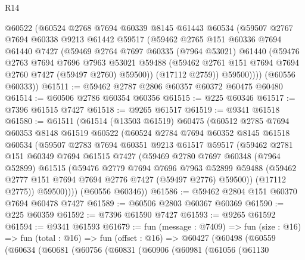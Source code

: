 \begin{lexlean}{R14}
\begin{coremodule}
        @60522
        (@60524
          @2768
          @7694
          @60339
          @8145
          @61443
          @60534
          (@59507
            @2767
            @7694
            @60338
            @9213
            @61442
            @59517
            (@59462
              @2765
              @151
              @60336
              @7694
              @61440
              @7427
              (@59469
                @2764
                @7697
                @60335
                (@7964 @53021)
                @61440
                (@59476
                  @2763
                  @7694
                  @7696
                  @7963
                  @53021
                  @59488
                  (@59462 @2761 @151 @7694 @7694 @2760 @7427 (@59497 @2760) @59500))
                (@17112 @2759))
              @59500))))
      (@60556 @60333))
@61511 := @59462 @2787 @2806 @60357 @60372 @60475 @60480
@61514 := @60506 @2786 @60354 @60356
@61515 := @225 @60346
@61517 := @7396 @61515 @7427
@61518 := @9265 @61517
@61519 := @9341 @61518
@61580 := @61511
    (@61514
      (@13503 @61519)
      @60475
      (@60512
        @2785
        @7694
        @60353
        @8148
        @61519
        @60522
        (@60524
          @2784
          @7694
          @60352
          @8145
          @61518
          @60534
          (@59507
            @2783
            @7694
            @60351
            @9213
            @61517
            @59517
            (@59462
              @2781
              @151
              @60349
              @7694
              @61515
              @7427
              (@59469
                @2780
                @7697
                @60348
                (@7964 @52899)
                @61515
                (@59476
                  @2779
                  @7694
                  @7696
                  @7963
                  @52899
                  @59488
                  (@59462 @2777 @151 @7694 @7694 @2776 @7427 (@59497 @2776) @59500))
                (@17112 @2775))
              @59500))))
      (@60556 @60346))
@61586 := @59462 @2804 @151 @60370 @7694 @60478 @7427
@61589 := @60506 @2803 @60367 @60369
@61590 := @225 @60359
@61592 := @7396 @61590 @7427
@61593 := @9265 @61592
@61594 := @9341 @61593
@61679 := fun (message : @7409) =>
  fun (size : @16) =>
  fun (total : @16) =>
  fun (offset : @16) =>
  @60427
    (@60498
      (@60559
        (@60634
          (@60681
            (@60756
              (@60831
                (@60906
                  (@60981
                    (@61056
                      (@61130

\end{coremodule}
\end{lexlean}
